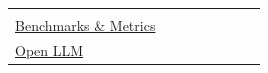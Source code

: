 \documentclass[smallextended]{svjour3}
\newcommand{\must}{\textbf{must}\xspace}
\newcommand{\should}{\textbf{should}\xspace}
\newcommand{\iconM}{\usebox{\iconMbox}\xspace}
\newcommand{\iconS}{\usebox{\iconSbox}\xspace}
\newcommand{\iconM}{●\xspace}
\newcommand{\iconS}{○\xspace}
\begin{document}
\begin{appendices}
\begin{center}
\begin{tabular}{@{} l c c c c c c c @{}}
  & \iconS %
  & \iconS %
  & \iconS %
  & \iconM %
  & \iconS %
  & \iconS %
  \\
\hyperref[sec:use-suitable-baselines-benchmarks-and-metrics]{Benchmarks \& Metrics}
  & \iconM %
  & \iconS %
  & \iconS %
  & \iconS %
  & \iconS %
  & \iconS %
  & \iconM %
  \\
\hyperref[sec:use-an-open-llm-as-a-baseline]{Open LLM}
  & \iconS %
  & \iconS %

\end{tabular}
\end{center}
\end{appendices}
\end{document}
